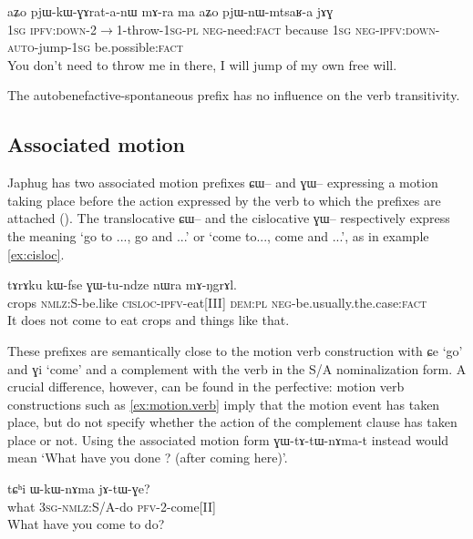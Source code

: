 \documentclass[oldfontcommands,oneside,a4paper,11pt]{article}
\newcommand{\ipa}[1]{{\phon#1}} %
\begin{document}
\begin{exe}
\ex \label{ex:pjWnWmtsaRa}
\gll 
\ipa{aʑo} 	\ipa{pjɯ-kɯ-ɣɤrat-a-nɯ} 	\ipa{mɤ-ra} 	\ipa{ma} 	\ipa{aʑo} 	\ipa{pjɯ-nɯ-mtsaʁ-a} 	\ipa{jɤɣ} \\
\textsc{1sg} \textsc{ipfv:down}-2$\rightarrow$1-throw-\textsc{1sg-pl} \textsc{neg-}need:\textsc{fact} because \textsc{1sg} \textsc{neg-ipfv:down-auto}-jump-\textsc{1sg} be.possible:\textsc{fact} \\
\glt You don't need to throw me in there, I will jump of my own free will.
\end{exe}

The autobenefactive-spontaneous prefix has no influence on the verb transitivity.

\subsection{Associated motion}
Japhug has two associated motion prefixes \ipa{ɕɯ--} and \ipa{ɣɯ--} expressing a motion taking place before the action expressed by the verb to which the prefixes are attached 
(\citealt{jacques13harmonization}). The translocative \ipa{ɕɯ--} and the cislocative \ipa{ɣɯ--} respectively express the meaning `go to ..., go and ...' or `come to..., come and ...', as in example \ref{ex:cisloc}.


\begin{exe}
\ex \label{ex:cisloc}
\gll
\ipa{tɤrɤku} 	\ipa{kɯ-fse} 	\ipa{ɣɯ-tu-ndze} 	\ipa{nɯra} 	\ipa{mɤ-ŋgrɤl.} \\
crops \textsc{nmlz}:S-be.like \textsc{cisloc-ipfv}-eat[III] \textsc{dem:pl} \textsc{neg-}be.usually.the.case:\textsc{fact} \\
\glt It does not come to eat crops and things like that.
\end{exe}

These prefixes are semantically close to the motion verb construction with \ipa{ɕe} `go' and \ipa{ɣi} `come' and a complement with the verb in the S/A nominalization form. A crucial difference, however, can be found in the perfective:  motion verb constructions such as \ref{ex:motion.verb} imply that the motion event has taken place, but do not specify whether the action of the complement clause has taken place or not. Using the associated motion form \ipa{ɣɯ-tɤ-tɯ-nɤma-t} instead would mean `What have you done ? (after coming here)'.

\begin{exe}
\ex \label{ex:motion.verb}
\gll
\ipa{tɕʰi} 	\ipa{ɯ-kɯ-nɤma} 	\ipa{jɤ-tɯ-ɣe?} \\
what \textsc{3sg-nmlz:}S/A-do \textsc{pfv-2}-come[II] \\
\glt What have you come to do?
\end{exe}
\end{document}
